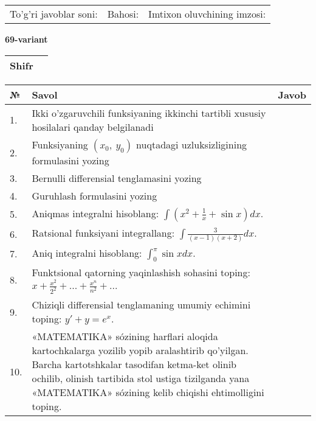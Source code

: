 \documentclass{article}
\begin{document}
  \vspace{1cm}
  
  \begin{tabular}{lll}
  To'g'ri javoblar soni: \underline{\hspace{1.5cm}} & 
  Bahosi: \underline{\hspace{1.5cm}} & 
  Imtixon oluvchining imzosi: \underline{\hspace{2cm}} \\
  \end{tabular}
  
  \egroup
  
  \newpage
  
  
  \textbf{69-variant}\\
  
  \bgroup
  \def\arraystretch{1.6} %
  
  \begin{tabular}{|m{5.7cm}|m{9.5cm}|}
  \hline
  Shifr & \\
  \hline
  \end{tabular}
  
  \vspace{1cm}
  
  \begin{tabular}{|m{0.7cm}|m{10cm}|m{4cm}|}
  \hline
  № & Savol & Javob \\
  \hline
  1. & Ikki o'zgaruvchili funksiyaning ikkinchi tartibli xususiy hosilalari qanday belgilanadi &  \\
  \hline
  2. & Funksiyaning \((x_{0},\ y_{0})\) nuqtadagi uzluksizligining formulasini yozing &  \\
  \hline
  3. & Bernulli differensial tenglamasini yozing &  \\
  \hline
  4. & Guruhlash formulasini yozing &  \\
  \hline
  5. & Aniqmas integralni hisoblang: \(\int {\left( x^{2} + \frac{1}{x} + \sin x \right)dx}\). &  \\
  \hline
  6. & Ratsional funksiyani integrallang: \(\int {\frac{3}{(x - 1)(x + 2)}dx}\). &  \\
  \hline
  7. & Aniq integralni hisoblang: \(\int_{0}^{\pi}{\sin xdx}\). &  \\
  \hline
  8. & Funktsional qatorning yaqinlashish sohasini toping: \(x + \frac{x^{2}}{2^{2}} + ... + \frac{x^{n}}{n^{2}} + ...\) &  \\
  \hline
  9. & Chiziqli differensial tenglamaning umumiy echimini toping: \(y' + y = e^{x}\). &  \\
  \hline
  10. & «MATEMATIKA» sózining harflari aloqida kartochkalarga yozilib yopib aralashtirib qo'yilgan. Barcha kartotshkalar tasodifan ketma-ket olinib ochilib, olinish tartibida stol ustiga tizilganda yana «MATEMATIKA» sózining kelib chiqishi ehtimolligini toping. &  \\
  \hline
  \end{tabular}
  
\end{document}
